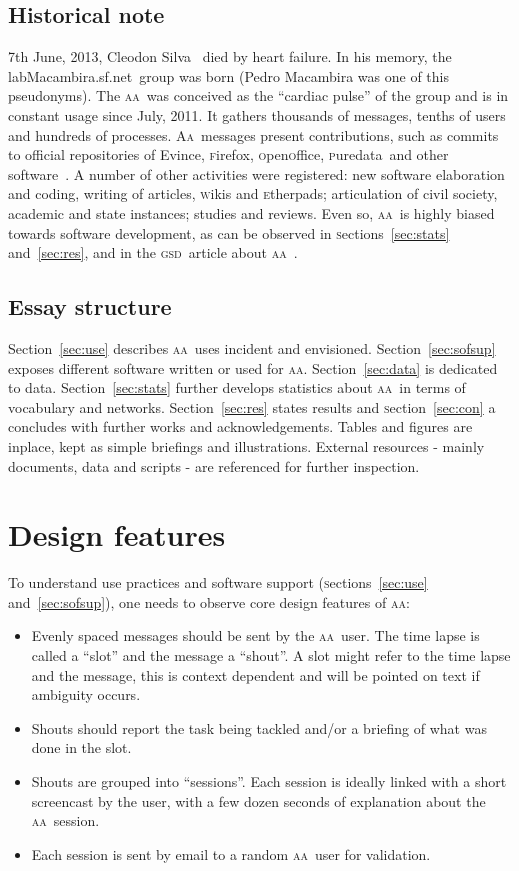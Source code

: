 \documentclass[a4paper, 11pt]{article} %
\newcommand{\firefox}{\textsc{f}irefox}
\newcommand{\openoffice}{\textsc{o}pen\textsc{o}ffice}
\newcommand{\puredata}{\textsc{p}uredata}
\newcommand{\wiki}{\textsc{w}iki}
\newcommand{\etherpad}{\textsc{e}therpad}
\newcommand{\sectionb}{\textsc{s}ection}
\newcommand{\aab}{\textsc{aa}}
\newcommand{\aai}{\textsc{Aa}}
\newcommand{\gsd}{\textsc{gsd}}
\newcommand{\lm}{lab\textsc{M}acambira.sf.net}
\begin{document}
\subsection{Historical note}
7th June, 2013, Cleodon Silva~\cite{cleodon} died by heart failure. In his memory, the \lm\ group was born (Pedro Macambira was one of this pseudonyms). The \aab\ was conceived as the ``cardiac pulse'' of the group and is in constant usage since July, 2011. It gathers thousands of messages, tenths of users and hundreds of processes. \aai\ messages present contributions, such as  commits to official repositories of Evince, \firefox, \openoffice, \puredata\ and other software~\cite{paaper}. A number of other activities were registered: new software elaboration and coding, writing of articles, \wiki s and \etherpad s; articulation of civil society, academic and state instances; studies and reviews. Even so, \aab\ is highly biased towards software development, as can be observed in \sectionb s~\ref{sec:stats} and~\ref{sec:res}, and in the \gsd\ article about \aab~\cite{paaper}.

\subsection{Essay structure}\label{sec:ess}
Section~\ref{sec:use} describes \aab\ uses incident and envisioned.
Section~\ref{sec:sofsup} exposes different software written or used for \aab. Section~\ref{sec:data} is dedicated to data. Section~\ref{sec:stats} further develops statistics about \aab\ in terms of vocabulary and networks. Section~\ref{sec:res} states results and \sectionb~\ref{sec:con} a concludes with further works and acknowledgements. Tables and figures are inplace, kept as simple briefings and illustrations. External resources - mainly documents, data and scripts - are referenced for further inspection.

\section{Design features}\label{sec:desf}
To understand use practices and software support (\sectionb s~\ref{sec:use} and~\ref{sec:sofsup}), one needs to observe core design features of \aab:
\begin{itemize}
    \item Evenly spaced messages should be sent by the \aab\ user. The time lapse is called a ``slot'' and the message a ``shout''. A slot might refer to the time lapse and the message, this is context dependent and will be pointed on text if ambiguity occurs.
    \item Shouts should report the task being tackled and/or a briefing of what was done in the slot.
    \item Shouts are grouped into ``sessions''. Each session is ideally linked with a short screencast by the user, with a few dozen seconds of explanation about the \aab\ session.
    \item Each session is sent by email to a random \aab\ user for validation.
\end{itemize}
\end{document}
